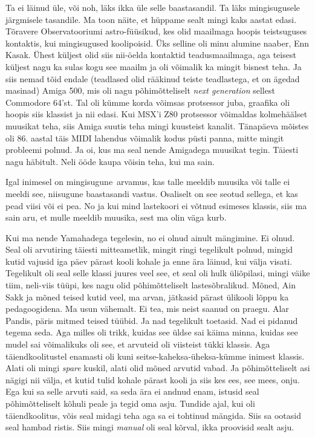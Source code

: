 Ta ei läinud üle, või noh, läks ikka üle selle baastasandil. Ta läks 
mingisugusele järgmisele tasandile. Ma toon näite, et hüppame sealt mingi kaks 
aastat edasi. Tõravere Observatooriumi 
astro-füüsikud, kes olid maailmaga  hoopis teistsuguses kontaktis, kui 
mingisugused koolipoisid. Üks selline oli minu alumine naaber,  Enn 
Kasak. Ühest küljest olid siis nii-öelda kontaktid 
teadusmaailmaga, aga teisest küljest nagu ka sulas kogu see maailm ja oli 
võimalik ka mingit bisnest teha. Ja siis nemad tõid endale (teadlased olid 
rääkinud teiste teadlastega, et on ägedad masinad) Amiga 
500,  mis oli nagu 
põhimõtteliselt \emph{next generation} sellest Commodore 64'st. Tal oli kümme 
korda võimsas protsessor juba,  graafika oli hoopis siis klassist ja nii edasi. 
Kui MSX'i Z80 protsessor  võimaldas  kolmehäälset muusikat teha, siis Amiga 
suutis teha mingi kuusteist kanalit. Tänapäeva mõistes oli 86. aastal täis MIDI 
lahendus  võimalik kodus püsti panna, mitte mingit probleemi polnud. Ja oi, kus 
ma seal nende Amigadega muusikat tegin. Täiesti nagu häbitult. Neli ööde kaupa 
võisin teha, kui ma sain.


Igal inimesel on mingisugune arvamus, kas talle  meeldib muusika või talle ei 
meeldi see, niisugune baastasandi vastus. Osaliselt on see seotud sellega, et 
kas pead viisi või ei pea. No ja kui mind lastekoori ei võtnud esimeses 
klassis, siis ma sain aru, et mulle meeldib muusika, sest ma olin  väga kurb. 

Kui ma nende Yamahadega tegelesin, no ei olnud ainult mängimine. Ei olnud. Seal 
oli arvutiring täiesti mitteametlik, mingit ringi tegelikult polnud, mingid 
kutid vajusid iga päev pärast kooli kohale ja enne ära läinud, kui välja 
visati. Tegelikult oli seal selle klassi juures veel see, et seal oli hulk 
üliõpilasi, mingi väike tiim, neli-viis tüüpi, kes nagu olid põhimõtteliselt 
lastesõbralikud. Mõned, Ain Sakk ja mõned teised kutid  
veel,  ma arvan, jätkasid pärast ülikooli lõppu ka pedagoogidena. Ma usun 
vähemalt. Ei tea, mis neist saanud on praegu. Alar Pandis, päris mitmed teised tüübid.  Ja nad tegelikult toetasid. Nad ei pidanud 
tegema seda. Aga milles oli trikk, kuidas see üldse sai käima minna, kuidas see 
mudel sai võimalikuks oli see, et arvuteid oli viisteist tükki klassis. Aga 
täiendkoolitustel enamasti oli kuni seitse-kaheksa-üheksa-kümme inimest 
klassis. Alati oli mingi \emph{spare} kuskil, alati olid mõned arvutid vabad. 
Ja põhimõtteliselt asi nägigi nii välja, et kutid tulid kohale pärast  kooli ja 
siis kes ees, see mees, onju. Ega kui sa selle arvuti said, sa seda ära ei 
andnud enam, istusid seal põhimõtteliselt kõhuli peale ja tegid oma asju. 
Tundide ajal, kui oli täiendkoolitus, võis seal midagi teha aga sa ei tohtinud 
mängida. Siis sa ootasid seal hambad ristis. Siis mingi \emph{manual} oli seal 
kõrval, ikka proovisid sealt asju. 

